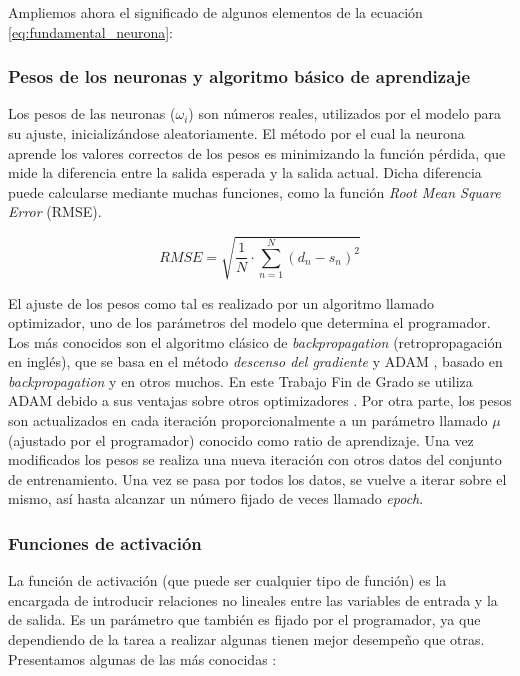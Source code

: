 \documentclass[../main.tex]{subfiles}
\begin{document}
Ampliemos ahora el significado de algunos elementos de la ecuación \ref{eq:fundamental_neurona}:

\subsubsection{Pesos de los neuronas y algoritmo básico de aprendizaje}
Los pesos de las neuronas ($\omega_{i}$) son números reales, utilizados por el modelo para su ajuste, inicializándose aleatoriamente. El método por el cual la neurona aprende los valores correctos de los pesos es minimizando la función pérdida, que mide la diferencia entre la salida esperada y la salida actual. Dicha diferencia puede calcularse mediante muchas funciones, como la función \textit{Root Mean Square Error} (RMSE).

\begin{equation}
    RMSE = \sqrt{\frac{1}{N}  \cdot \sum_{n=1}^{N} (d_n - s_n)^2}
\end{equation}

El ajuste de los pesos como tal es realizado por un algoritmo llamado optimizador, uno de los parámetros del modelo que determina el programador. Los más conocidos son el algoritmo clásico de \textit{backpropagation} (retropropagación en inglés), que se basa en el método \textit{descenso del gradiente} y ADAM , basado en \textit{backpropagation} y en otros muchos. En este Trabajo Fin de Grado se utiliza ADAM debido a sus ventajas sobre otros optimizadores \cite{kingma2017adam}. \newline
Por otra parte, los pesos son actualizados en cada iteración proporcionalmente a un parámetro llamado $\mu$ (ajustado por el programador) conocido como ratio de aprendizaje. Una vez modificados los pesos se realiza una nueva iteración con otros datos del conjunto de entrenamiento. Una vez se pasa por todos los datos, se vuelve a iterar sobre el mismo, así hasta alcanzar un número fijado de veces llamado \textit{epoch}.

\subsubsection{Funciones de activación}
La función de activación (que puede ser cualquier tipo de función) es la encargada de introducir relaciones no lineales entre las variables de entrada y la de salida. Es un parámetro que también es fijado por el programador, ya que dependiendo de la tarea a realizar algunas tienen mejor desempeño que otras. Presentamos algunas de las más conocidas \cite{Kzrak2019}:
\end{document}
